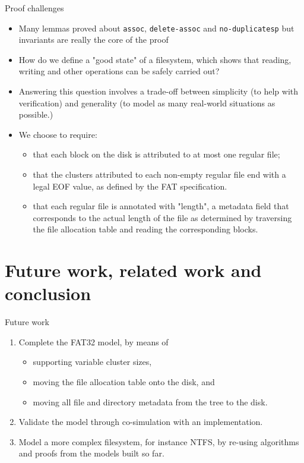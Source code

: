 \documentclass{beamer}
\begin{document}
\begin{frame}{Proof challenges}
  \begin{itemize}
  \item Many lemmas proved about \texttt{assoc},
    \texttt{delete-assoc} and \texttt{no-duplicatesp} but invariants
    are really the core of the proof
  \item How do we define a "good state" of a filesystem, which shows
    that reading, writing and other operations can be safely carried
    out?
  \item Answering this question involves a trade-off between
    simplicity (to help with verification) and generality (to model as
    many real-world situations as possible.)
  \item We choose to require:
    \begin{itemize}
    \item that each block on the disk is attributed to at most one
      regular file;
    \item that the clusters attributed to each non-empty regular file
      end with a legal EOF value, as defined by the FAT specification.
    \item that each regular file is annotated with "length", a
      metadata field that corresponds to the actual length of the file
      as determined by traversing the file allocation table and
      reading the corresponding blocks.
    \end{itemize}
  \end{itemize}
\end{frame}

\section{Future work, related work and conclusion}

\begin{frame}{Future work}
  \begin{enumerate}
  \item Complete the FAT32 model, by means of
    \begin{itemize}
    \item supporting variable cluster sizes,
    \item moving the file allocation table onto the disk, and
    \item moving all file and directory metadata from the tree to the
      disk.
    \end{itemize}
  \item Validate the model through co-simulation with an implementation.
  \item Model a more complex filesystem, for instance NTFS, by
    re-using algorithms and proofs from the models built so far.
  \end{enumerate}
\end{frame}
\end{document}
